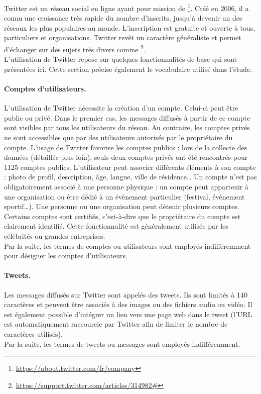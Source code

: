         Twitter est un réseau social en ligne ayant pour mission de \footnote{\url{https://about.twitter.com/fr/company}}. Créé en 2006, il a connu une croissance très rapide du nombre d’inscrits, jusqu’à devenir un des réseaux les plus populaires au monde. L’inscription est gratuite et ouverte à tous, particuliers et organisations. Twitter revêt un caractère généraliste et permet d’échanger sur des sujets très divers comme \footnote{\url{https://support.twitter.com/articles/314982\#}}.\\

        L’utilisation de Twitter repose sur quelques fonctionnalités de base qui sont présentées ici. Cette section précise également le vocabulaire utilisé dans l’étude.

        \paragraph{Comptes d’utilisateurs.}
        L’utilisation de Twitter nécessite la création d’un compte. Celui-ci peut être public ou privé. Dans le premier cas, les messages diffusés à partir de ce compte sont visibles par tous les utilisateurs du réseau. Au contraire, les comptes privés ne sont accessibles que par des utilisateurs autorisés par le propriétaire du compte. L’usage de Twitter favorise les comptes publics : lors de la collecte des données (détaillée plus loin), seuls deux comptes privés ont été rencontrés pour 1125 comptes publics. L’utilisateur peut associer différents éléments à son compte : photo de profil, description, âge, langue, ville de résidence…
        Un compte n’est pas obligatoirement associé à une personne physique : un compte peut appartenir à une organisation ou être dédié à un évènement particulier (festival, évènement sportif…). Une personne ou une organisation peut détenir plusieurs comptes. Certains comptes sont certifiés, c’est-à-dire que le propriétaire du compte est clairement identifié. Cette fonctionnalité est généralement utilisée par les célébrités ou grandes entreprises. \\
        Par la suite, les termes de  \og comptes  \fg{} ou  \og utilisateurs  \fg{} sont employés indifféremment pour désigner les comptes d’utilisateurs.

        \paragraph{Tweets.}
        Les messages diffusés sur Twitter sont appelés des tweets. Ils sont limités à 140 caractères  et peuvent être associés à des images ou des fichiers audio ou vidéo. Il est également possible d’intégrer un lien vers une page web dans le tweet (l’URL est automatiquement raccourcie par Twitter afin de limiter le nombre de caractères utilisés). \\
        Par la suite, les termes de  \og tweets  \fg{} ou  \og messages  \fg{} sont employés indifféremment.

